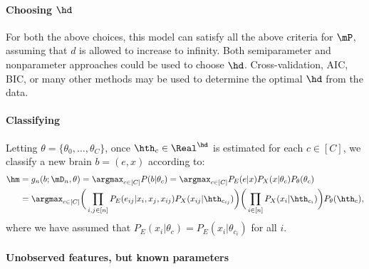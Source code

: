 \documentclass{article}
\begin{document}
\paragraph{Choosing $\hd$}

For both the above choices, this model can satisfy all the above criteria for $\mP$, assuming that $d$ is allowed to increase to infinity.  Both semiparameter and nonparameter approaches could be used to choose $\hd$.  Cross-validation, AIC, BIC, or many other methods may be used to determine the optimal $\hd$ from the data. 


\paragraph{Classifying}

Letting $\theta=\{\theta_0,\ldots,\theta_C\}$, once $\hth_c \in \Real^{\hd}$ is estimated for each $c\in[C]$, we classify a new brain $b=(e,x)$ according to:
\begin{align}
	 \hm &= g_n(b; \mD_n, \theta) = \argmax_{c\in[C]} P(b | \theta_c) 
	 	 = \argmax_{c\in[C]}  P_E(e | x)  P_X(x | \theta_c) P_{\theta}(\theta_c) \nonumber \\
		&= \argmax_{c\in[C]}  \bigg(\prod_{i,j \in [n]} P_E(e_{ij} | x_i, x_j, x_{ij}) P_X(x_{ij} | \hth_{c_{ij}})\bigg) \bigg(\prod_{i \in [n]} P_X(x_i | \hth_{c_i})\bigg)  P_{\theta}(\hth_c)
		,
\end{align}
where we have assumed that $P_E(x_i | \theta_c)=P_E(x_i | \theta_{c_i})$ for all $i$.


\paragraph{Unobserved features, but known parameters}
\end{document}
